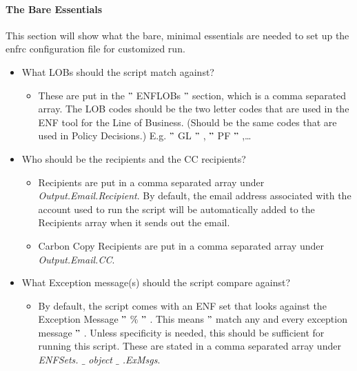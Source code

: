 \documentclass[a4paper,12pt]{report}
\begin{document}
\paragraph*{The Bare Essentials}
 \par
This section will show what the bare, minimal essentials are needed to set up the enfrc configuration file for customized run. \par
\begin{itemize}
\item What LOBs should the script match against? \par
\begin{itemize}
\item These are put in the  $ " $ ENFLOBs $ " $  section, which is a comma separated array. The LOB codes should be the two letter codes that are used in the ENF tool for the Line of Business. (Should be the same codes that are used in Policy Decisions.) E.g.  $ " $ GL $ " $ ,  $ " $ PF $ " $ ,… \par
\end{itemize}
\item Who should be the recipients and the CC recipients? \par
\begin{itemize}
\item Recipients are put in a comma separated array under \textit{Output.Email.Recipient}. By default, the email address associated with the account used to run the script will be automatically added to the Recipients array when it sends out the email. \par
\item Carbon Copy Recipients are put in a comma separated array under \textit{Output.Email.CC}. \par
\end{itemize}
\item What Exception message(s) should the script compare against? \par
\begin{itemize}
\item By default, the script comes with an ENF set that looks against the Exception Message  $ " $  $  \%  $  $ " $ . This means  $ " $ match any and every exception message $ " $ . Unless specificity is needed, this should be sufficient for running this script. These are stated in a comma separated array under \textit{ENFSets}\textit{. $  \_  $ object $  \_  $ .}\textit{ExMsgs}. \par
\end{itemize}

\end{itemize}
\end{document}
